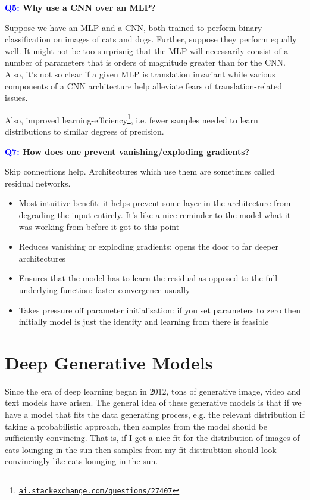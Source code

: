 \documentclass[11pt]{article}
\begin{document}
\begin{center}
    \textbf{\textcolor{blue}{Q5:} Why use a CNN over an MLP?}
\end{center}
Suppose we have an MLP and a CNN, both trained to perform binary classification on images of cats and dogs. Further, suppose they perform equally well. It might not be too surprisnig that the MLP will necessarily consist of a number of parameters that is orders of magnitude greater than for the CNN. Also, it's not so clear if a given MLP is translation invariant while various components of a CNN architecture help alleviate fears of translation-related issues.

Also, improved learning-efficiency\footnote{\href{https://ai.stackexchange.com/questions/27407/what-does-statistical-efficiency-mean-in-this-context}{\texttt{ai.stackexchange.com/questions/27407}}}, i.e. fewer samples needed to learn distributions to similar degrees of precision.


\begin{center}
    \textbf{\textcolor{blue}{Q7:} How does one prevent vanishing/exploding gradients?}
\end{center}

\noindent Skip connections help. Architectures which use them are sometimes called residual networks.
\begin{itemize}
    \item Most intuitive benefit: it helps prevent some layer in the architecture from degrading the input entirely. It's like a nice reminder to the model what it was working from before it got to this point
    \item Reduces vanishing or exploding gradients: opens the door to far deeper architectures
    \item Ensures that the model has to learn the residual as opposed to the full underlying function: faster convergence usually
    \item Takes pressure off parameter initialisation: if you set parameters to zero then initially model is just the identity and learning from there is feasible
\end{itemize}

\section{Deep Generative Models}

 Since the era of deep learning began in 2012, tons of generative image, video and text models have arisen. The general idea of these generative models is that if we have a model that fits the data generating process, e.g. the relevant distribution if taking a probabilistic approach, then samples from the model should be sufficiently convincing. That is, if I get a nice fit for the distribution of images of cats lounging in the sun then samples from my fit distirubtion should look convincingly like cats lounging in the sun.
\end{document}
